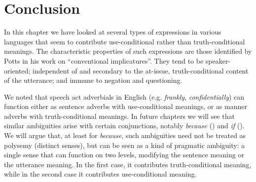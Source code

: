 \section{Conclusion}\label{sec:11.7}

In this chapter we have looked at several types of expressions in various languages that seem to contribute use-conditional rather than truth-conditional meanings. The characteristic properties of such expressions are those identified by Potts in his work on “conventional implicatures”. They tend to be speaker-oriented; independent of and secondary to the at-issue, truth-conditional content of the utterance; and immune to negation and questioning.



We noted that speech act adverbials in English (e.g. \textit{frankly}, \textit{confidentially}) can function either as sentence adverbs with use-conditional meanings, or as manner adverbs with truth-conditional meanings. In future chapters we will see that similar ambiguities arise with certain conjunctions, notably \textit{because} () and \textit{if} (). We will argue that, at least for \textit{because}, such ambiguities need not be treated as polysemy (distinct senses), but can be seen as a kind of pragmatic ambiguity: a single sense that can function on two levels, modifying the sentence meaning or the utterance meaning. In the first case, it contributes truth-conditional meaning, while in the second case it contributes use-conditional meaning.



 
